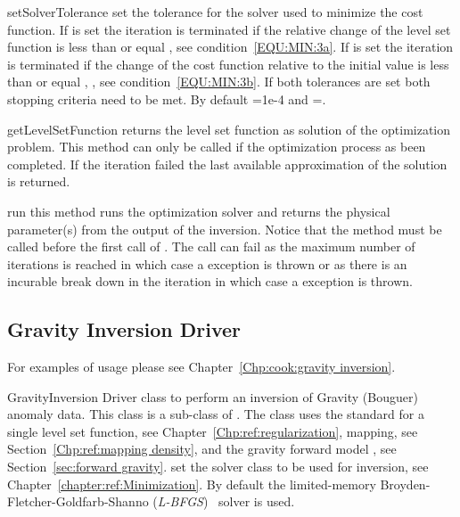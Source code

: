 \begin{methoddesc}[InversionDriver]{setSolverTolerance}{ }
set the tolerance for the solver used to minimize the cost function. If  is set the iteration is terminated 
if the relative change of the level set function is less than or equal , see condition~\ref{EQU:MIN:3a}. 
If  is set the iteration is terminated if the change of the cost
function relative to the initial value is less than or equal , , see condition~\ref{EQU:MIN:3b}.
If both tolerances are set both stopping criteria need to be met.
By default =1e-4 and =\None.
\end{methoddesc}

\begin{methoddesc}[InversionDriver]{getLevelSetFunction}{}
returns the level set function as solution of the optimization problem.
This method can only be called if the optimization process as been completed.
If the iteration failed the last available approximation of the solution is returned.
\end{methoddesc}
        
\begin{methoddesc}[InversionDriver]{run}{}
this method runs the optimization solver and returns the physical parameter(s)
from the output of the inversion. Notice that the  method must be
called before the first call of .
The call can fail as the maximum number of iterations is reached in which case
a  exception is thrown or as there is an
incurable break down in the iteration in which case a  exception is thrown. 
\end{methoddesc}

\subsection{Gravity Inversion Driver}
For examples of usage please see Chapter~\ref{Chp:cook:gravity inversion}.

\begin{classdesc}{GravityInversion}{}
Driver class to perform an inversion of Gravity (Bouguer) anomaly data.
This class is a sub-class of . The class uses the
standard  for a single level set function,
see Chapter~\ref{Chp:ref:regularization},  mapping,
see Section~\ref{Chp:ref:mapping density}, and the gravity forward model
, see Section~\ref{sec:forward gravity}.
 set the solver class to be used for inversion,
see Chapter~\ref{chapter:ref:Minimization}.
 By default the limited-memory Broyden-Fletcher-Goldfarb-Shanno (\emph{L-BFGS})~\cite{Nocedal1980} solver is used.

\end{classdesc}

